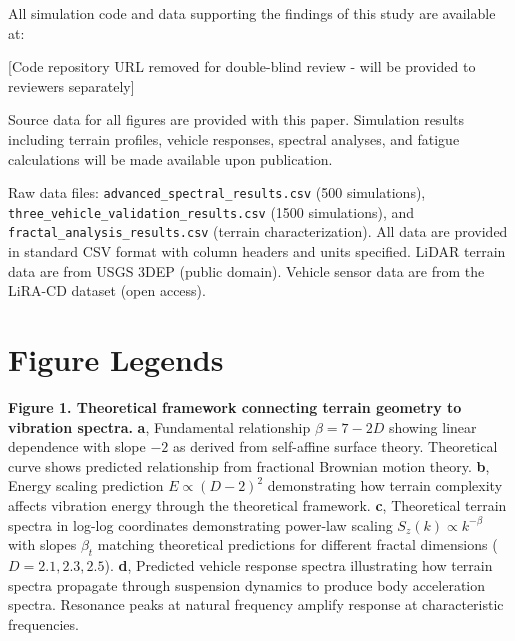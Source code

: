 \documentclass[11pt]{article}
\begin{document}
All simulation code and data supporting the findings of this study are available at:

\begin{center}
[Code repository URL removed for double-blind review - will be provided to reviewers separately]
\end{center}

Source data for all figures are provided with this paper. Simulation results including terrain profiles, vehicle responses, spectral analyses, and fatigue calculations will be made available upon publication. 

Raw data files: \texttt{advanced\_spectral\_results.csv} (500 simulations), \texttt{three\_\allowbreak vehicle\_\allowbreak validation\_\allowbreak results.csv} (1500 simulations), and \texttt{fractal\_\allowbreak analysis\_\allowbreak results.csv} (terrain characterization). All data are provided in standard CSV format with column headers and units specified. LiDAR terrain data are from USGS 3DEP (public domain). Vehicle sensor data are from the LiRA-CD dataset (open access).




\section*{Figure Legends}

\textbf{Figure 1. Theoretical framework connecting terrain geometry to vibration spectra.} 
\textbf{a}, Fundamental relationship $\beta = 7-2D$ showing linear dependence with slope $-2$ as derived from self-affine surface theory. Theoretical curve shows predicted relationship from fractional Brownian motion theory. 
\textbf{b}, Energy scaling prediction $E \propto (D-2)^2$ demonstrating how terrain complexity affects vibration energy through the theoretical framework.
\textbf{c}, Theoretical terrain spectra in log-log coordinates demonstrating power-law scaling $S_z(k) \propto k^{-\beta}$ with slopes $\beta_t$ matching theoretical predictions for different fractal dimensions ($D = 2.1, 2.3, 2.5$).
\textbf{d}, Predicted vehicle response spectra illustrating how terrain spectra propagate through suspension dynamics to produce body acceleration spectra. Resonance peaks at natural frequency amplify response at characteristic frequencies.
\end{document}
